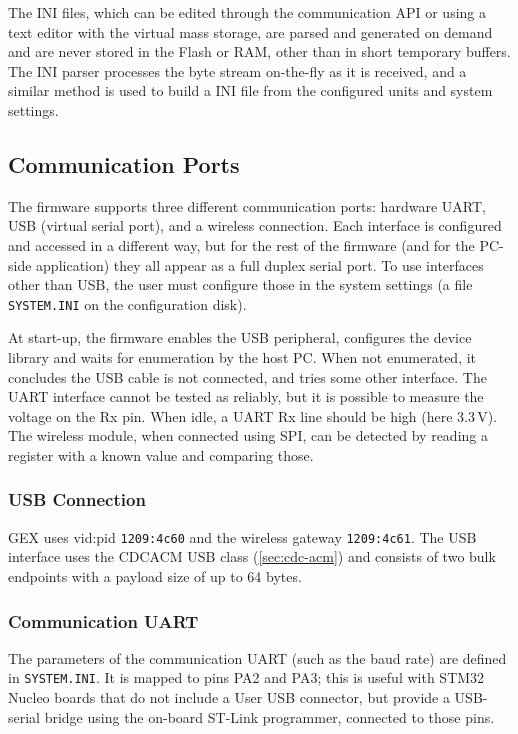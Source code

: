 The INI files, which can be edited through the communication \gls{API} or using a text editor with the virtual mass storage, are parsed and generated on demand and are never stored in the Flash or \gls{RAM}, other than in short temporary buffers. The INI parser processes the byte stream on-the-fly as it is received, and a similar method is used to build a INI file from the configured units and system settings.

\subsection{Communication Ports} \label{sec:com-ports}

The firmware supports three different communication ports: hardware \gls{UART}, \gls{USB} (virtual serial port), and a wireless connection. Each interface is configured and accessed in a different way, but for the rest of the firmware (and for the \gls{PC}-side application) they all appear as a full duplex serial port. To use interfaces other than \gls{USB}, the user must configure those in the system settings (a file \verb|SYSTEM.INI| on the configuration disk).

At start-up, the firmware enables the \gls{USB} peripheral, configures the device library and waits for enumeration by the host \gls{PC}. When not enumerated, it concludes the \gls{USB} cable is not connected, and tries some other interface. The \gls{UART} interface cannot be tested as reliably, but it is possible to measure the voltage on the Rx pin. When idle, a \gls{UART} Rx line should be high (here 3.3\,V). The wireless module, when connected using \gls{SPI}, can be detected by reading a register with a known value and comparing those.

\subsubsection{USB Connection}

GEX uses vid:pid \verb|1209:4c60| and the wireless gateway \verb|1209:4c61|. The \gls{USB} interface uses the \gls{CDCACM} \gls{USB} class (\cref{sec:cdc-acm}) and consists of two bulk endpoints with a payload size of up to 64 bytes.

\subsubsection{Communication UART}

The parameters of the communication \gls{UART} (such as the baud rate) are defined in \verb|SYSTEM.INI|. It is mapped to pins PA2 and PA3; this is useful with STM32 Nucleo boards that do not include a User \gls{USB} connector, but provide a \gls{USB}-serial bridge using the on-board ST-Link programmer, connected to those pins.

